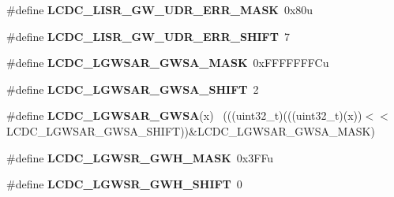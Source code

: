 \begin{DoxyCompactItemize}
\item 
\hypertarget{group___l_c_d_c___register___masks_ga1931c116d2be6c8377f4dd9b1317315d}{}\#define {\bfseries L\+C\+D\+C\+\_\+\+L\+I\+S\+R\+\_\+\+G\+W\+\_\+\+U\+D\+R\+\_\+\+E\+R\+R\+\_\+\+M\+A\+S\+K}~0x80u\label{group___l_c_d_c___register___masks_ga1931c116d2be6c8377f4dd9b1317315d}

\item 
\hypertarget{group___l_c_d_c___register___masks_gae172af5c91b3865da2868796a3c63126}{}\#define {\bfseries L\+C\+D\+C\+\_\+\+L\+I\+S\+R\+\_\+\+G\+W\+\_\+\+U\+D\+R\+\_\+\+E\+R\+R\+\_\+\+S\+H\+I\+F\+T}~7\label{group___l_c_d_c___register___masks_gae172af5c91b3865da2868796a3c63126}

\item 
\hypertarget{group___l_c_d_c___register___masks_gaed8f98866540b178719dea86d4129c4f}{}\#define {\bfseries L\+C\+D\+C\+\_\+\+L\+G\+W\+S\+A\+R\+\_\+\+G\+W\+S\+A\+\_\+\+M\+A\+S\+K}~0x\+F\+F\+F\+F\+F\+F\+F\+Cu\label{group___l_c_d_c___register___masks_gaed8f98866540b178719dea86d4129c4f}

\item 
\hypertarget{group___l_c_d_c___register___masks_ga45d6808286f8cfa4947c097b5f78df46}{}\#define {\bfseries L\+C\+D\+C\+\_\+\+L\+G\+W\+S\+A\+R\+\_\+\+G\+W\+S\+A\+\_\+\+S\+H\+I\+F\+T}~2\label{group___l_c_d_c___register___masks_ga45d6808286f8cfa4947c097b5f78df46}

\item 
\hypertarget{group___l_c_d_c___register___masks_ga67541545c7b33aab28ba770dbda619e7}{}\#define {\bfseries L\+C\+D\+C\+\_\+\+L\+G\+W\+S\+A\+R\+\_\+\+G\+W\+S\+A}(x)                                        ~(((uint32\+\_\+t)(((uint32\+\_\+t)(x))$<$$<$L\+C\+D\+C\+\_\+\+L\+G\+W\+S\+A\+R\+\_\+\+G\+W\+S\+A\+\_\+\+S\+H\+I\+F\+T))\&L\+C\+D\+C\+\_\+\+L\+G\+W\+S\+A\+R\+\_\+\+G\+W\+S\+A\+\_\+\+M\+A\+S\+K)\label{group___l_c_d_c___register___masks_ga67541545c7b33aab28ba770dbda619e7}

\item 
\hypertarget{group___l_c_d_c___register___masks_gab1df34b755ad35c7910f3f4137925c72}{}\#define {\bfseries L\+C\+D\+C\+\_\+\+L\+G\+W\+S\+R\+\_\+\+G\+W\+H\+\_\+\+M\+A\+S\+K}~0x3\+F\+Fu\label{group___l_c_d_c___register___masks_gab1df34b755ad35c7910f3f4137925c72}

\item 
\hypertarget{group___l_c_d_c___register___masks_ga96f82b94727036758455a1d76c9d804e}{}\#define {\bfseries L\+C\+D\+C\+\_\+\+L\+G\+W\+S\+R\+\_\+\+G\+W\+H\+\_\+\+S\+H\+I\+F\+T}~0\label{group___l_c_d_c___register___masks_ga96f82b94727036758455a1d76c9d804e}


\end{DoxyCompactItemize}
